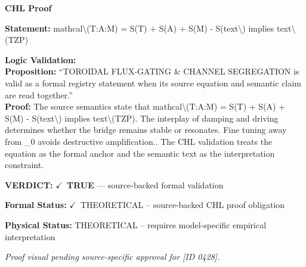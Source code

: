 \vspace{0.45em}
\noindent\textbf{CHL Proof}\par
\textbf{Statement:} mathcal\textbackslash{}(T:A:M) = S(T) + S(A) + S(M) - S(text\textbackslash{}) implies text\textbackslash{}(TZP)

\textbf{Logic Validation:}\\
\textbf{Proposition:} ``TOROIDAL FLUX-GATING \& CHANNEL SEGREGATION is valid as a formal registry statement when
its source equation and semantic claim are read together.''\\
\textbf{Proof:} The source semantics state that mathcal\textbackslash{}(T:A:M) = S(T) + S(A) + S(M) - S(text\textbackslash{}) implies
text\textbackslash{}(TZP). The interplay of damping and driving determines whether the bridge remains
stable or resonates. Fine tuning  away from \_0 avoids destructive amplification..
The CHL validation treats the equation as the formal anchor and the semantic text as the
interpretation constraint.

\textbf{VERDICT:} \ensuremath{\checkmark}\ \textbf{TRUE} --- source-backed formal validation

\textbf{Formal Status:} \ensuremath{\checkmark}\ THEORETICAL -- source-backed CHL proof obligation

\textbf{Physical Status:} THEORETICAL -- requires model-specific empirical interpretation
\par\vspace{0.45em}
\par
\vfill
\begingroup\footnotesize\itshape
Proof visual pending source-specific approval for [ID 0428].
\par\endgroup
\vfill
\endgroup
\endgroup
